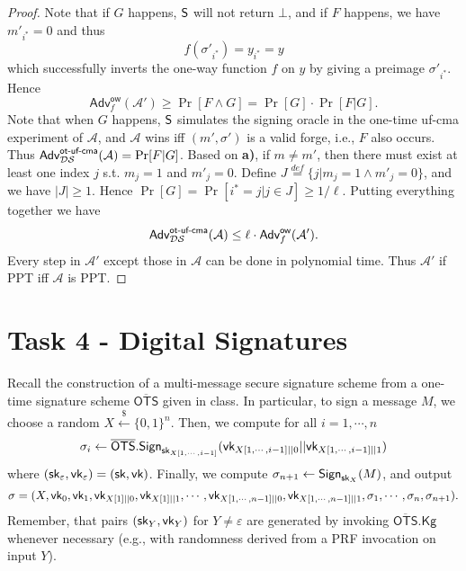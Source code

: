 \documentclass[12pt]{article}
\newcommand{\eqdef}{\stackrel{def}{=}}
\newcommand{\bits}{\{0,1\}}
\newcommand{\getsr}{\stackrel{\$}{\gets}}
\newcommand{\Adv}{\textsf{Adv}}
\theoremstyle{definition}
\newcommand{\Kg}{\textsf{Kg}}
\newcommand{\sk}{\textsf{sk}}
\newcommand{\A}{\mathcal{A}}
\begin{document}
\begin{proof}
Note that if $G$ happens, $\textsf{S}$ will not return $\bot$, and if $F$ happens, we have $m'_{i^*} = 0$ and thus
$$f(\sigma'_{i^*}) = y_{i^*} = y$$
which successfully inverts the one-way function $f$ on $y$ by giving a preimage $\sigma'_{i^*}$. 
Hence
$$\Adv_{f}^{\textsf{ow}}(\A') \geq \Pr[F\wedge G] = \Pr[G]\cdot\Pr[F|G].$$
Note that when $G$ happens, $\textsf{S}$ simulates the signing oracle in the one-time uf-cma experiment of $\A$, and $\A$ wins iff $(m',\sigma')$ is a valid forge, i.e., $F$ also occurs. Thus $\Adv_{\DS}^{\textsf{ot-uf-cma}}(\A) = \Pr[F|G]$.
Based on {\bf a)}, if $m\not=m'$, then there must exist at least one index $j$ s.t. $m_j=1$ and $m'_j=0$. Define $J \eqdef \{j|m_j=1 \wedge m'_j=0\}$, and we have $|J|\geq 1$. Hence $\Pr[G] = \Pr[i^* = j|j\in J] \geq 1/\ell$. Putting everything together we have
$$\Adv_{\DS}^{\textsf{ot-uf-cma}}(\A) \leq \ell\cdot\Adv_{f}^{\textsf{ow}}(\A').$$
Every step in $\A'$ except those in $\A$ can be done in polynomial time. Thus $\A'$ if PPT iff $\A$ is PPT.
\end{proof}

\newcommand{\OTS}{\overline{\textsf{OTS}}}
\section{Task 4 - Digital Signatures}
Recall the construction of a multi-message secure signature scheme from a one-time signature
scheme $\OTS$ given in class. In particular, to sign a message $M$, we choose a random $X \getsr \bits^n$. Then, we compute for all $i=1,\cdots,n$
$$\sigma_i \gets \OTS.\Sign_{\sk_{X[1,\cdots,i-1]}}(\vk_{X[1,\cdots,i-1]||0} || \vk_{X[1,\cdots,i-1]||1})$$
where $(\sk_{\varepsilon}, \vk_{\varepsilon}) = (\sk, \vk)$. Finally, we compute $\sigma_{n+1} \gets \Sign_{\sk_X}(M)$, and output 
$$\sigma = (X, \textsf{vk}_0, \textsf{vk}_1, \textsf{vk}_{X[1]||0}, \textsf{vk}_{X[1]||1},\cdots,\textsf{vk}_{X[1,\cdots,n-1]||0},\textsf{vk}_{X[1,\cdots,n-1]||1}, \sigma_1,\cdots,\sigma_n,\sigma_{n+1}).$$
Remember, that pairs $(\sk_Y,\vk_Y)$ for $Y\not=\varepsilon$ are generated by invoking $\OTS.\Kg$ whenever necessary (e.g., with randomness derived from a PRF invocation on input $Y$).
\end{document}
